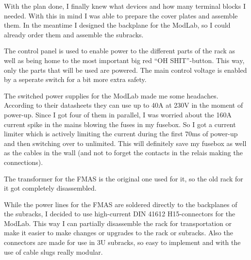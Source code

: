 With the plan done, I finally knew what devices and how many terminal blocks I needed. With this in mind I was able to prepare the cover plates and assemble them. In the meantime I designed the backplane for the ModLab, so I could already order them and assemble the subracks. 

The control panel is used to enable power to the different parts of the rack as well as being home to the most important big red ``OH SHIT''-button. This way, only the parts that will be used are powered. The main control voltage is enabled by a seperate switch for a bit more extra safety. 

The switched power supplies for the ModLab made me some headaches. According to their datasheets they can use up to 40A at 230V in the moment of power-up. Since I got four of them in parallel, I was worried about the 160A current spike in the mains blowing the fuses in my fusebox. So I got a current limiter which is actively limiting the current during the first 70ms of power-up and then switching over to unlimited. This will definitely save my fusebox as well as the cables in the wall (and not to forget the contacts in the relais making the connections). 

The transformer for the FMAS is the original one used for it, so the old rack for it got completely disassembled. 

\vspace{1cm}

While the power lines for the FMAS are soldered directly to the backplanes of the subracks, I decided to use high-current DIN 41612 H15-connectors for the ModLab. This way I can partially disassemble the rack for transportation or make it easier to make changes or upgrades to the rack or subracks. Also the connectors are made for use in 3U subracks, so easy to implement and with the use of cable slugs really modular. 
